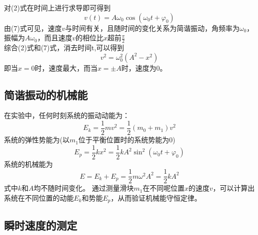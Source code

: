 \documentclass[UTF8]{article}
\theoremstyle{MyLineTheoremStyle} %
\theoremstyle{MyBlockTheoremStyle} %
\theoremstyle{MySubsubsectionStyle} %
\begin{document}
对(2)式在时间上进行求导即可得到
\begin{equation}
    v(t)=A\omega_{0}\cos(\omega_{0} t+\varphi_{0})
\end{equation}
由(7)式可见，速度$v$与时间有关，且随时间的变化关系为简谐振动，角频率为$\omega_{0}$，振幅为$A\omega_{0}$，而且速度$v$的相位比$x$超前$\frac{\pi}{2}$\\

综合(2)式和(7)式，消去时间t,可以得到
\begin{equation}
    v^{2}=\omega_{0}^{2}(A^{2}-x^{2})
\end{equation}
即当$x=0$时，速度最大，而当$x=\pm A$时，速度为0。\\










\subsection{简谐振动的机械能}

在实验中，任何时刻系统的振动动能为：
\begin{equation}
    E_{k}=\frac{1}{2}mv^{2}=\frac{1}{2}(m_{0}+m_{1})v^{2}
\end{equation}
系统的弹性势能为(以$m_{1}$位于平衡位置时的系统势能为0)
\begin{equation}
    E_{p}=\frac{1}{2}kx^{2}=\frac{1}{2}kA^{2}\sin^{2}(\omega_{0} t+\varphi_{0})
\end{equation}
系统的机械能为
\begin{equation}
    E=E_{k}+E_{p}=\frac{1}{2}m\omega^{2}A^{2}=\frac{1}{2}kA^{2}
\end{equation}
式中$k$和$A$均不随时间变化。
通过测量滑块$m_1$在不同呢位置$x$的速度$v$，可以计算出系统在不同位置的动能$E_{k}$和势能$E_{p}$，从而验证机械能守恒定律。\\



\subsection{瞬时速度的测定}
\end{document}
